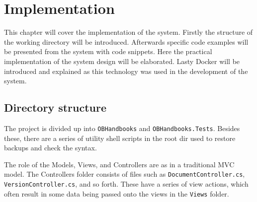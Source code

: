 \chapter{Implementation}
This chapter will cover the implementation of the system.
Firstly the structure of the working directory will be introduced.
Afterwards specific code examples will be presented from the system with code snippets.
Here the practical implementation of the system design will be elaborated.
Lasty Docker will be introduced and explained as this technology was used in the development of the system.

\section{Directory structure}
The project is divided up into \texttt{OBHandbooks} and \texttt{OBHandbooks.Tests}.
Besides these, there are a series of utility shell scripts in the root dir used to restore backups and check the syntax.

The role of the Models, Views, and Controllers are as in a traditional MVC model. The Controllers folder consists of files such as \texttt{DocumentController.cs}, \texttt{VersionController.cs}, and so forth. These have a series of view actions, which often result in some data being passed onto the views in the \texttt{Views} folder.


